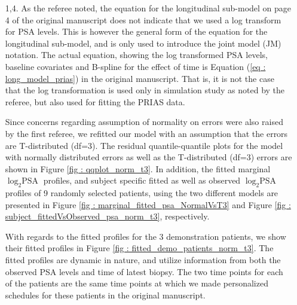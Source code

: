 \begin{enumerate}
    \item [1,4.] 	
    As the referee noted, the equation for the longitudinal sub-model on page 4 of the original manuscript does not indicate that we used a log transform for PSA levels. This is however the general form of the equation for the longitudinal sub-model, and is only used to introduce the joint model (JM) notation. The actual equation, showing the log transformed PSA levels, baseline covariates and B-spline for the effect of time is Equation (\ref{eq : long_model_prias}) in the original manuscript. That is, it is not the case that the log transformation is used only in simulation study as noted by the referee, but also used for fitting the PRIAS data. 

    Since concerns regarding assumption of normality on errors were also raised by the first referee, we refitted our model with an assumption that the errors are T-distributed (df=3). The residual quantile-quantile plots for the model with normally distributed errors as well as the T-distributed (df=3) errors are shown in Figure \ref{fig : qqplot_norm_t3}. In addition, the fitted marginal $\log_2 \mbox{PSA}$ profiles, and subject specific fitted as well as observed $\log_2 \mbox{PSA}$ profiles of 9 randomly selected patients, using the two different models are presented in Figure \ref{fig : marginal_fitted_psa_NormalVsT3} and Figure \ref{fig : subject_fittedVsObserved_psa_norm_t3}, respectively.

    With regards to the fitted profiles for the 3 demonstration patients, we show their fitted profiles in Figure \ref{fig : fitted_demo_patients_norm_t3}. The fitted profiles are dynamic in nature, and utilize information from both the observed PSA levels and time of latest biopsy. The two time points for each of the patients are the same time points at which we made personalized schedules for these patients in the original manuscript.
    

\end{enumerate}
